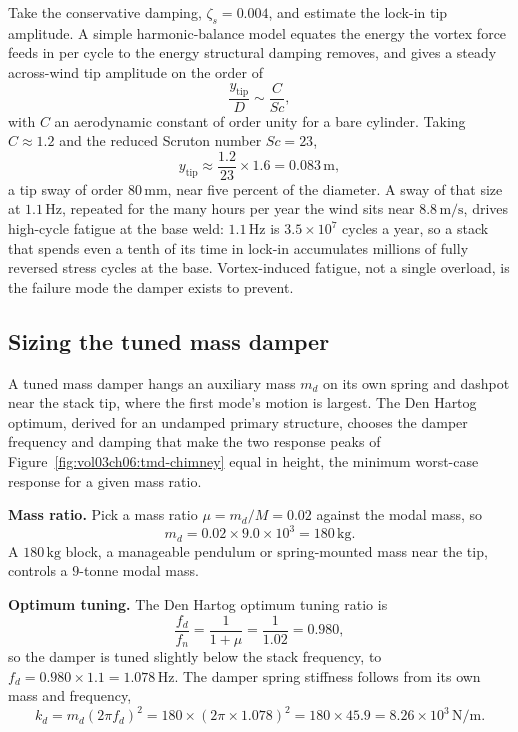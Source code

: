 Take the conservative damping, $\zeta_s = 0.004$, and estimate the
lock-in tip amplitude. A simple harmonic-balance model equates the
energy the vortex force feeds in per cycle to the energy structural
damping removes, and gives a steady across-wind tip amplitude on the
order of
\[
\frac{y_{\text{tip}}}{D}\sim \frac{C}{\mathit{Sc}},
\]
with $C$ an aerodynamic constant of order unity for a bare cylinder.
Taking $C \approx 1.2$ and the reduced Scruton number $\mathit{Sc} =
23$,
\[
y_{\text{tip}}\approx \frac{1.2}{23}\times 1.6 = 0.083\,\si{\meter},
\]
a tip sway of order $80\,\si{\milli\meter}$, near five percent of the
diameter. A sway of that size at $1.1\,\si{\hertz}$, repeated for the
many hours per year the wind sits near $8.8\,\si{\meter\per\second}$,
drives high-cycle fatigue at the base weld: $1.1\,\si{\hertz}$ is
$3.5\times 10^7$ cycles a year, so a stack that spends even a tenth of
its time in lock-in accumulates millions of fully reversed stress cycles
at the base. Vortex-induced fatigue, not a single overload, is the
failure mode the damper exists to prevent.

\subsection{Sizing the tuned mass damper}

A tuned mass damper hangs an auxiliary mass $m_d$ on its own spring and
dashpot near the stack tip, where the first mode's motion is largest.
The Den Hartog optimum, derived for an undamped primary structure,
chooses the damper frequency and damping that make the two response
peaks of Figure~\ref{fig:vol03ch06:tmd-chimney} equal in height, the
minimum worst-case response for a given mass ratio.



\textbf{Mass ratio.} Pick a mass ratio $\mu = m_d/M = 0.02$ against the
modal mass, so
\[
m_d = 0.02\times 9.0\times 10^3 = 180\,\si{\kilogram}.
\]
A $180\,\si{\kilogram}$ block, a manageable pendulum or spring-mounted
mass near the tip, controls a $9$-tonne modal mass.

\textbf{Optimum tuning.} The Den Hartog optimum tuning ratio is
\[
\frac{f_d}{f_n} = \frac{1}{1 + \mu} = \frac{1}{1.02} = 0.980,
\]
so the damper is tuned slightly below the stack frequency, to $f_d =
0.980\times 1.1 = 1.078\,\si{\hertz}$. The damper spring stiffness
follows from its own mass and frequency,
\[
k_d = m_d(2\pi f_d)^2 = 180\times (2\pi\times 1.078)^2 = 180\times
45.9 = 8.26\times 10^3\,\si{\newton\per\meter}.
\]

